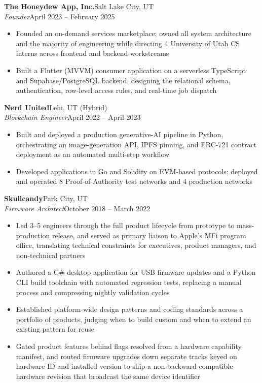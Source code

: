 \documentclass[10.5pt, letterpaper]{article}
\newcommand{\jobentry}[4]{%
  \noindent
  \textbf{\color{accent}#1}\hfill\textcolor{muted}{\small #2}\\
  \textit{#3}\hfill\textcolor{muted}{\small #4}%
}
\begin{document}
\jobentry{The Honeydew App, Inc.}{Salt Lake City, UT}{Founder}{April 2023 -- February 2025}
\begin{itemize}
  \item Founded an on-demand services marketplace; owned all system architecture and
        the majority of engineering while directing 4 University of Utah CS interns
        across frontend and backend workstreams
  \item Built a Flutter (MVVM) consumer application on a serverless TypeScript and
        Supabase/PostgreSQL backend, designing the relational schema, authentication,
        row-level access rules, and real-time job dispatch
\end{itemize}

\vspace{3pt}

\jobentry{Nerd United}{Lehi, UT (Hybrid)}{Blockchain Engineer}{April 2022 -- April 2023}
\begin{itemize}
  \item Built and deployed a production generative-AI pipeline in Python,
        orchestrating an image-generation API, IPFS pinning, and ERC-721 contract
        deployment as an automated multi-step workflow
  \item Developed applications in Go and Solidity on EVM-based protocols; deployed
        and operated 8 Proof-of-Authority test networks and 4 production networks
\end{itemize}

\vspace{3pt}

\jobentry{Skullcandy}{Park City, UT}{Firmware Architect}{October 2018 -- March 2022}
\begin{itemize}
  \item Led 3--5 engineers through the full product lifecycle from prototype to
        mass-production release, and served as primary liaison to Apple's MFi program
        office, translating technical constraints for executives, product managers,
        and non-technical partners
  \item Authored a C\# desktop application for USB firmware updates and a Python CLI
        build toolchain with automated regression tests, replacing a manual process
        and compressing nightly validation cycles
  \item Established platform-wide design patterns and coding standards across a
        portfolio of products, judging when to build custom and when to extend an
        existing pattern for reuse
  \item Gated product features behind flags resolved from a hardware capability
        manifest, and routed firmware upgrades down separate tracks keyed on hardware
        ID and installed version to ship a non-backward-compatible hardware revision
        that broadcast the same device identifier
\end{itemize}
\end{document}
